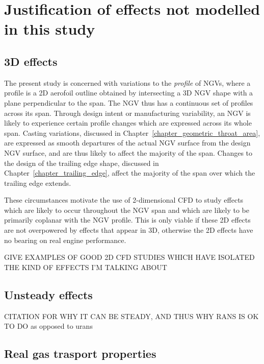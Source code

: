 \documentclass[a4paper, 11pt, oneside]{report}
\begin{document}
\section{Justification of effects not modelled in this study}
\label{justification_of_effects_not_modelled_in_this_study}

\subsection{3D effects}
The present study is concerned with variations to the \textit{profile} of NGVs, where a profile is a 2D aerofoil outline obtained by intersecting a 3D NGV shape with a plane perpendicular to the span. The NGV thus has a continuous set of profiles across its span. Through design intent or manufacturing variability, an NGV is likely to experience certain profile changes which are expressed across its whole span. Casting variations, discussed in Chapter~\ref{chapter_geometric_throat_area}, are expressed as smooth departures of the actual NGV surface from the design NGV surface, and are thus likely to affect the majority of the span. Changes to the design of the trailing edge shape, discussed in Chapter~\ref{chapter_trailing_edge}, affect the majority of the span over which the trailing edge extends.

These circumstances motivate the use of 2-dimensional CFD to study effects which are likely to occur throughout the NGV span and which are likely to be primarily coplanar with the NGV profile. This is only viable if these 2D effects are not overpowered by effects that appear in 3D, otherwise the 2D effects have no bearing on real engine performance.

GIVE EXAMPLES OF GOOD 2D CFD STUDIES WHICH HAVE ISOLATED THE KIND OF EFFECTS I'M TALKING ABOUT	


\subsection{Unsteady effects}

CITATION FOR WHY IT CAN BE STEADY, AND THUS WHY RANS IS OK TO DO as opposed to urans



\subsection{Real gas trasport properties}
\end{document}
